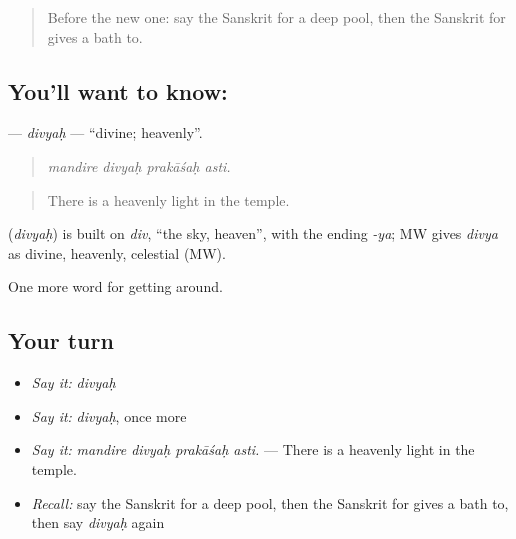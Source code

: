 \label{lesson:SA-C399-divyah}



\begin{quote}
Before the new one: say the Sanskrit for a deep pool, then the Sanskrit for gives a bath to.
\end{quote}

\subsection*{You'll want to know: }
\textbf{} — \emph{divyaḥ} — \textquotedblleft{}divine; heavenly\textquotedblright{}.

\begin{quote}
   
\end{quote}

\begin{quote}
\emph{mandire divyaḥ prakāśaḥ asti.}
\end{quote}

\begin{quote}
There is a heavenly light in the temple.
\end{quote}

\begin{cousinweb}
\textbf{} (\emph{divyaḥ}) is built on \emph{div}, \textquotedblleft{}the sky, heaven\textquotedblright{}, with the ending \emph{-ya}; MW gives \emph{divya} as divine, heavenly, celestial (MW).
\end{cousinweb}

\begin{grammarlens}[title={What you've built}]
One more word for getting around.
\end{grammarlens}

\subsection*{Your turn}
\begin{itemize}
\raggedright
  \item \emph{Say it:} \emph{divyaḥ}
  \item \emph{Say it:} \emph{divyaḥ}, once more
  \item \emph{Say it:} \emph{mandire divyaḥ prakāśaḥ asti.} — There is a heavenly light in the temple.
  \item \emph{Recall:} say the Sanskrit for a deep pool, then the Sanskrit for gives a bath to, then say \emph{divyaḥ} again
\end{itemize}

